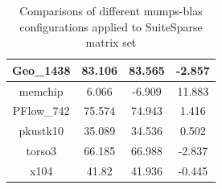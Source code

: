 \begin{table}[h!]
\begin{tabular}{|c|c|c|c|}
Geo\_1438                                             & 83.106                                                                                                  & 83.565                                                                                               & -2.857                                                                                                  \\ \hline
memchip                                               & 6.066                                                                                                   & -6.909                                                                                               & 11.883                                                                                                  \\ \hline
PFlow\_742                                            & 75.574                                                                                                  & 74.943                                                                                               & 1.416                                                                                                   \\ \hline
pkustk10                                              & 35.089                                                                                                  & 34.536                                                                                               & 0.502                                                                                                   \\ \hline
torso3                                                & 66.185                                                                                                  & 66.988                                                                                               & -2.837                                                                                                  \\ \hline
x104                                                  & 41.82                                                                                                   & 41.936                                                                                               & -0.445                                                                                                  \\ \hline
\end{tabular}
\caption{Comparisons of different \gls{mumps}-\gls{blas} configurations applied to SuiteSparse matrix set}
\label{table:mumps-blas-performance-gain-suitesprase}
\end{table}


